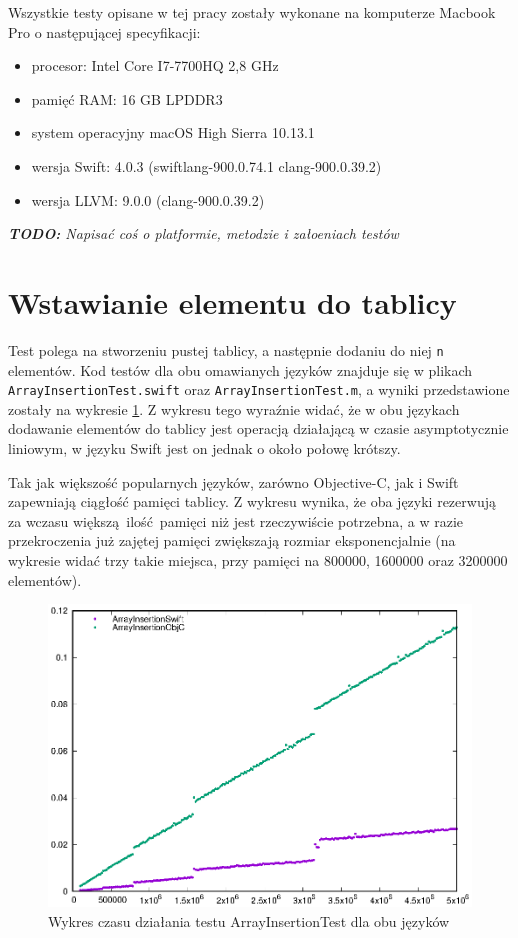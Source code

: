 \documentclass[mgr, shortabstract]{iithesis}
\newcommand{\todo}[1]{
  \textit{\textbf{TODO: }#1}
}
\newcommand{\swiftinline}[1]{
    \texttt{#1}
}
\begin{document}
Wszystkie testy opisane w tej pracy zostały wykonane na komputerze Macbook Pro o następującej specyfikacji:

\begin{itemize}
    \item procesor: Intel Core I7-7700HQ 2,8 GHz
    \item pamięć RAM: 16 GB LPDDR3
    \item system operacyjny macOS High Sierra 10.13.1
    \item wersja Swift: 4.0.3 (swiftlang-900.0.74.1 clang-900.0.39.2)
    \item wersja LLVM: 9.0.0 (clang-900.0.39.2)
\end{itemize}

\todo{Napisać coś o platformie, metodzie i załoeniach testów}

\section{Wstawianie elementu do tablicy}

Test polega na stworzeniu pustej tablicy, a następnie dodaniu do niej \swiftinline{n} elementów. Kod testów dla obu omawianych języków znajduje się w plikach \texttt{ArrayInsertionTest.swift} oraz \texttt{ArrayInsertionTest.m}, a wyniki przedstawione zostały na wykresie \ref{p:array_insertion}. Z wykresu tego wyraźnie widać, że w obu językach dodawanie elementów do tablicy jest operacją działającą w czasie asymptotycznie liniowym, w języku Swift jest on jednak o około połowę krótszy.

Tak jak większość popularnych języków, zarówno Objective-C, jak i Swift zapewniają ciągłość pamięci tablicy. Z wykresu wynika, że oba języki rezerwują za wczasu większą ilość pamięci niż jest rzeczywiście potrzebna, a w razie przekroczenia już zajętej pamięci zwiększają rozmiar eksponencjalnie (na wykresie widać trzy takie miejsca, przy pamięci na 800000, 1600000 oraz 3200000 elementów).

\begin{figure}
    \includegraphics{plots/ArrayInsertion.eps}
    \caption{Wykres czasu działania testu ArrayInsertionTest dla obu języków}
    \label{p:array_insertion}
\end{figure}
\end{document}
